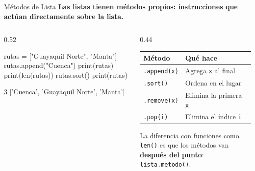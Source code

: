 \documentclass[aspectratio=169, 11pt]{beamer}
\begin{document}
\begin{frame}[fragile,shrink=30]{Métodos de Lista}
  \vspace{-6pt}
  {\small\color{arcaDark}\bfseries
    Las listas tienen \textbf{métodos} propios: instrucciones que actúan
    directamente sobre la lista.}

  \vspace{4pt}
  \begin{columns}[T]
    \begin{column}{0.52\textwidth}
      \begin{pyblock}
rutas = ["Guayaquil Norte", "Manta"]
rutas.append("Cuenca")
print(rutas)
print(len(rutas))
rutas.sort()
print(rutas)
      \end{pyblock}
      \vspace{-2pt}
      \begin{outputblock}
3
['Cuenca', 'Guayaquil Norte', 'Manta']
      \end{outputblock}
    \end{column}

    \begin{column}{0.44\textwidth}
      {\footnotesize
      \renewcommand{\arraystretch}{1.3}
      \begin{tabular}{@{}l l@{}}
        \toprule
        {\bfseries\color{arcaDark} Método}
        & {\bfseries\color{arcaDark} Qué hace} \\
        \midrule
        \texttt{.append(x)} & Agrega \texttt{x} al final \\
        \texttt{.sort()}    & Ordena en el lugar \\
        \texttt{.remove(x)} & Elimina la primera \texttt{x} \\
        \texttt{.pop(i)}    & Elimina el índice \texttt{i} \\
        \bottomrule
      \end{tabular}
      }

      \vspace{6pt}
      {\scriptsize\color{textMuted}
        La diferencia con funciones como \texttt{len()}
        es que los métodos van
        \textbf{después del punto}: \texttt{lista.metodo()}.}
    \end{column}
  \end{columns}
\end{frame}
\end{document}
